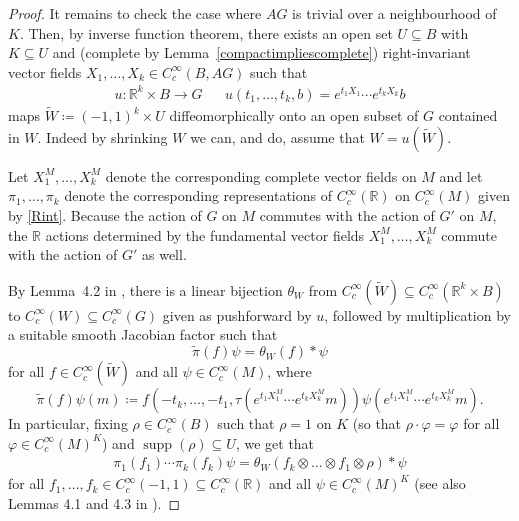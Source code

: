 \documentclass[12pt]{article}
\theoremstyle{plain}
\theoremstyle{definition}
\newcommand{\R}{\mathbb{R}}
\newcommand{\supp}{\operatorname{supp}}
\numberwithin{equation}{section}
\begin{document}
\begin{proof}
It remains to check the case where $AG$ is trivial over a neighbourhood of $K$.  Then, by inverse function theorem,  there exists an open set $U \subseteq B$ with $K \subseteq U$ and  (complete by Lemma~\ref{compactimpliescomplete}) right-invariant vector fields $X_1,\ldots,X_k \in C_c^\infty(B,AG)$  such that 
\begin{align*}
u : \R^k \times B \to G && u(t_1,\ldots,t_k,b) = e^{t_1X_1} \cdots e^{t_k X_k} b 
\end{align*}
maps $\widetilde W \coloneqq (-1,1)^k \times U$ diffeomorphically onto an open subset of $G$ contained in $W$. Indeed by shrinking $W$ we can, and do, assume that $W=u(\widetilde W)$.


Let $X_1^M,\ldots, X_k^M$ denote the corresponding complete vector fields on $M$ and let $\pi_1,\ldots, \pi_k$ denote the corresponding representations of $C_c^\infty(\R)$ on $C_c^\infty(M)$ given by \eqref{Rint}. Because the action of $G$ on $M$ commutes with the action of $G'$ on $M$, the $\R$ actions determined by the fundamental vector fields $X_1^M,\ldots,X_k^M$ commute with the action of $G'$ as well.


By Lemma~4.2 in \cite{Francis[DM]}, there is a linear bijection $\theta_W$ from $C_c^\infty(\widetilde W) \subseteq C_c^\infty(\R^k\times B)$ to $C_c^\infty(W) \subseteq C_c^\infty(G)$ given as pushforward by $u$, followed by multiplication by a suitable smooth Jacobian factor such that
\[ \widetilde\pi(f) \psi = \theta_W(f) * \psi \]
for all $f \in C_c^\infty(\widetilde W)$ and all $\psi \in C_c^\infty(M)$, where
\[ \widetilde\pi(f)\psi(m) \coloneqq f(-t_k,\ldots,-t_1,\tau(e^{t_1X_1^M}\cdots e^{t_k X_k^M}m))\psi(e^{t_1X_1^M}\cdots e^{t_k X_k^M}m) .\]
In particular, fixing $\rho \in C_c^\infty(B)$ such that $\rho=1$ on $K$ (so that $\rho\cdot \varphi = \varphi$ for all $\varphi \in C_c^\infty(M)^K$) and $\supp(\rho)\subseteq U$, we get that
\begin{align}\label{chartconv}
 \pi_1(f_1) \cdots \pi_k(f_k) \psi =  \theta_W( f_k \otimes \ldots \otimes f_1 \otimes \rho) * \psi \end{align}
for all $f_1, \ldots,f_k \in C_c^\infty(-1,1)\subseteq C_c^\infty(\R)$ and all $\psi \in C_c^\infty(M)^K$ (see also Lemmas 4.1 and 4.3 in \cite{Francis[DM]}). 




\end{proof}
\end{document}
